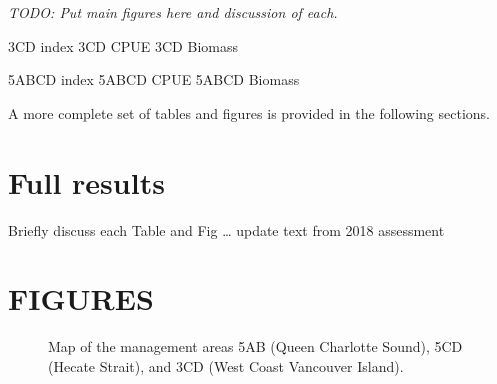 \documentclass[11pt]{book}
\begin{document}
\emph{TODO: Put main figures here and discussion of each.}

3CD index 3CD CPUE 3CD Biomass

5ABCD index 5ABCD CPUE 5ABCD Biomass

A more complete set of tables and figures is provided in the following sections.

\hypertarget{full-results}{%
\section{Full results}\label{full-results}}

Briefly discuss each Table and Fig \ldots{} update text from 2018 assessment

\clearpage

\hypertarget{figures}{%
\section{FIGURES}\label{figures}}
\begin{figure}[htb]

{\centering {} 

}

\caption{Map of the management areas 5AB (Queen Charlotte Sound), 5CD (Hecate Strait), and 3CD (West Coast Vancouver Island).}\label{fig:fig-map}
\end{figure}
\clearpage
\end{document}
